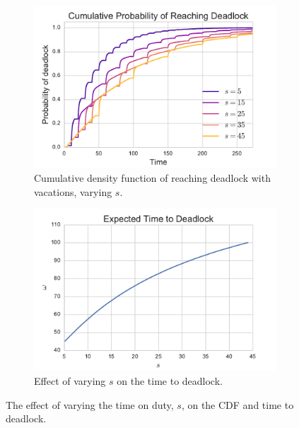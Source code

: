 \documentclass{article}
\begin{document}
\begin{figure}[!hbtp]
\begin{center}
\begin{subfigure}[b]{0.45\textwidth}
    \includegraphics[width=\textwidth]{img/cdf_vary_s.pdf}
    \caption{Cumulative density function of reaching deadlock with vacations, varying $s$.}
    \label{fig:cdf_varys}
\end{subfigure}
\begin{subfigure}[b]{0.45\textwidth}
    \includegraphics[width=\textwidth]{img/ttd_vary_s.pdf}
    \caption{Effect of varying $s$ on the time to deadlock.}
    \label{fig:ttd_varys}
\end{subfigure}
\end{center}
\caption{The effect of varying the time on duty, $s$, on the CDF and time to deadlock.}
\label{fig:ttdcdf_varys}
\end{figure}
\end{document}
